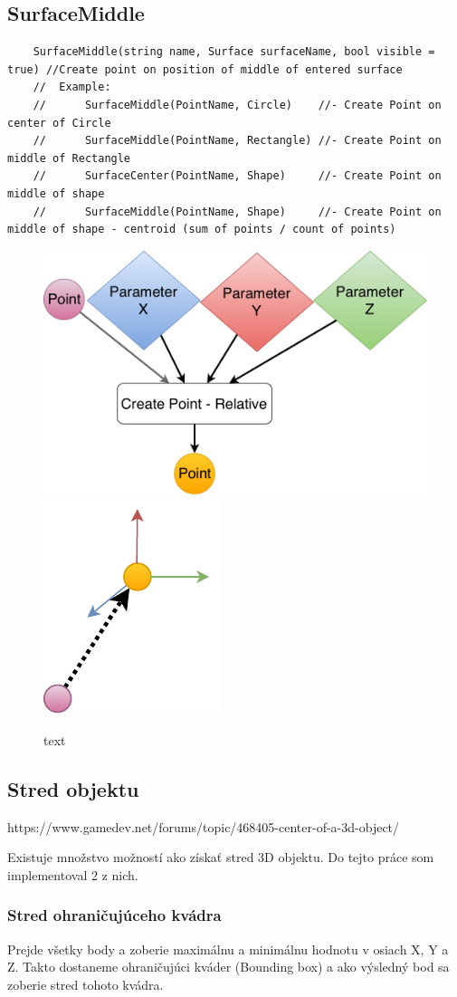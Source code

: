 \subsection{SurfaceMiddle}


\begin{lstlisting}
	SurfaceMiddle(string name, Surface surfaceName, bool visible = true) //Create point on position of middle of entered surface
	//	Example:
	//		SurfaceMiddle(PointName, Circle)	//- Create Point on center of Circle
	//		SurfaceMiddle(PointName, Rectangle)	//- Create Point on middle of Rectangle
	//		SurfaceCenter(PointName, Shape)		//- Create Point on middle of shape 
	//		SurfaceMiddle(PointName, Shape)		//- Create Point on middle of shape - centroid (sum of points / count of points)
\end{lstlisting}

\begin{figure}[H]
	\centering
	\includegraphics[height=0.3\textwidth]{obrazky-figures/Diagram/DP Navrh operacii-0D - Point2.pdf}
	\includegraphics[height=0.3\textwidth]{obrazky-figures/Diagram/Draw/1Points/DP Navrh operacii-0D - PointRelative.pdf}
	\caption{text}
	\label{fig:1}
\end{figure}

\subsection{Stred objektu}
https://www.gamedev.net/forums/topic/468405-center-of-a-3d-object/

Existuje množstvo možností ako získať stred 3D objektu. Do tejto práce som implementoval 2 z nich. 
\subsubsection{Stred ohraničujúceho kvádra}
Prejde všetky body a zoberie maximálnu a minimálnu hodnotu v osiach X, Y a Z. Takto dostaneme ohraničujúci kváder (Bounding box) a ako výsledný bod sa zoberie stred tohoto kvádra.

